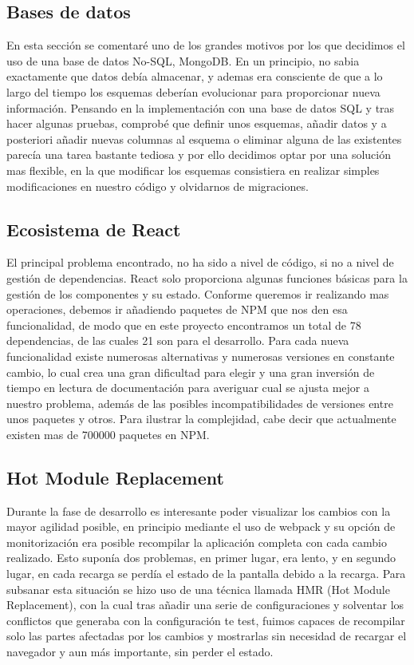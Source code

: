 \subsection {Bases de datos}
En esta sección se comentaré uno de los grandes motivos por los que decidimos el uso de una base de datos No-SQL, MongoDB. En un principio, no sabia exactamente que datos debía almacenar, y ademas era consciente de que a lo largo del tiempo los esquemas deberían evolucionar para proporcionar nueva información. Pensando en la implementación con una base de datos SQL y tras hacer algunas pruebas, comprobé que definir unos esquemas, añadir datos y a posteriori añadir nuevas columnas al esquema o eliminar alguna de las existentes parecía una tarea bastante tediosa y por ello decidimos optar por una solución mas flexible, en la que modificar los esquemas consistiera en realizar simples modificaciones en nuestro código y olvidarnos de migraciones.

\subsection {Ecosistema de React}
El principal problema encontrado, no ha sido a nivel de código, si no a nivel de gestión de dependencias. React solo proporciona algunas funciones básicas para la gestión de los componentes y su estado. Conforme queremos ir realizando mas operaciones, debemos ir añadiendo paquetes de NPM que nos den esa funcionalidad, de modo que en este proyecto encontramos un total de 78 dependencias, de las cuales 21 son para el desarrollo. Para cada nueva funcionalidad existe numerosas alternativas y numerosas versiones en constante cambio, lo cual crea una gran dificultad para elegir y una gran inversión de tiempo en lectura de documentación para averiguar cual se ajusta mejor a nuestro problema, además de las posibles incompatibilidades de versiones entre unos paquetes y otros. Para ilustrar la complejidad, cabe decir que actualmente existen mas de 700000 paquetes en NPM.

\subsection {Hot Module Replacement}
Durante la fase de desarrollo es interesante poder visualizar los cambios con la mayor agilidad posible, en principio mediante el uso de webpack y su opción de monitorización era posible recompilar la aplicación completa con cada cambio realizado. Esto suponía dos problemas, en primer lugar, era lento, y en segundo lugar, en cada recarga se perdía el estado de la pantalla debido a la recarga. Para subsanar esta situación se hizo uso de una técnica llamada HMR (Hot Module Replacement), con la cual tras añadir una serie de configuraciones y solventar los conflictos que generaba con la configuración te test, fuimos capaces de recompilar solo las partes afectadas por los cambios y mostrarlas sin necesidad de recargar el navegador y aun más importante, sin perder el estado.










